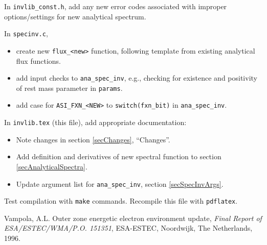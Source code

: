 \documentclass{article}    %
\begin{document}
In \verb|invlib_const.h|, add any new error codes associated with
improper options/settings for new analytical spectrum.

In \verb|specinv.c|, 
\begin{itemize}
\item create new \verb|flux_<new>| function, following template from existing analytical flux functions.
\item add input checks to \verb|ana_spec_inv|, e.g., checking for existence and positivity of rest mass parameter in \verb|params|.
\item add case for \verb|ASI_FXN_<NEW>| to \verb|switch(fxn_bit)| in \verb|ana_spec_inv|.
\end{itemize}

In \verb|invlib.tex| (this file), add appropriate documentation:
\begin{itemize}
\item Note changes in section \ref{secChanges}, ``Changes''.
\item Add definition and derivatives of new spectral function to section \ref{secAnalyticalSpectra}.
\item Update argument list for \verb|ana_spec_inv|, section \ref{secSpecInvArgs}.
\end{itemize}

Test compilation with \verb|make| commands. Recompile this file with \verb|pdflatex|.

\begin{thebibliography}{}
Vampola, A.L.
Outer zone energetic electron environment update,
{\it Final Report of ESA/ESTEC/WMA/P.O. 151351}, 
ESA-ESTEC, Noordwijk, The Netherlands, 1996.
\end{thebibliography}
\end{document}

